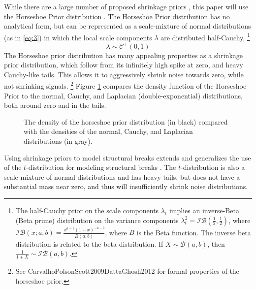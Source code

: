 \documentclass{article}
\newcommand{\dist}[1]{\mathcal{#1}}
\newcommand{\paren}[1]{\ensuremath{\left(#1\right)}}
\newcommand{\dhalfcauchy}[1]{\ensuremath{\dist{C}^{+}\paren{#1}}}
\newcommand{\dbeta}[1]{\ensuremath{\dist{B}\paren{#1}}}
\newcommand{\dinvbeta}[1]{\ensuremath{\dist{IB}\paren{#1}}}
\begin{document}
While there are a large number of proposed shrinkage priors \textcite{ArmaganDunsonLee2011}\textcite{BrownGriffin2010}\textcite{PolsonScott2010}, this paper will use the Horseshoe Prior distribution \parencites{CarvalhoPolsonScott2009}{CarvalhoPolsonScott2010}{PolsonScott2010}{PolsonScott2012}{DattaGhosh2012}.
The Horseshoe Prior distribution has no analytical form, but can be represented as a scale-mixture of normal distributions (as in \eqref{eq:3}) in which the local scale components $\lambda$ are distributed half-Cauchy,%
\footnote{
The half-Cauchy prior on the scale components $\lambda_{t}$ implies an inverse-Beta (Beta prime) distribution on the variance components $\lambda_{t}^{2} = \dinvbeta{\frac{1}{2}, \frac{1}{2}}$, where $\dinvbeta{x; a, b} = \frac{x^{a - 1} (1 + x)^{-a - b}}{B(a, b)}$, where $B$ is the Beta function.
The inverse beta distribution is related to the beta distribution.
If $X \sim \dbeta{a, b}$, then $\frac{1}{1 + X} \sim \dinvbeta{a, b}$.
}
\begin{equation}
  \label{eq:6}
  \lambda \sim \dhalfcauchy{0, 1}
\end{equation}
The Horseshoe prior distribution has many appealing properties as a shrinkage prior distribution, which follow from its infinitely high spike at zero, and heavy Cauchy-like tails.
This allows it to aggressively shrink noise towards zero, while not shrinking signals.%
\footnote{See \textcite{CarvalhoPolsonScott2010}{CarvalhoPolsonScott2009}{DattaGhosh2012} for formal properties of the horseshoe prior.}
Figure \ref{fig:horseshoe} compares the density function of the Horseshoe Prior to the normal, Cauchy, and Laplacian (double-exponential) distributions, both around zero and in the tails.
\begin{figure}
  \centering
  \caption{The density of the horseshoe prior distribution (in black) compared with the densities of the normal, Cauchy, and Laplacian distributions (in gray).}
  \label{fig:horseshoe}
\end{figure}

Using shrinkage priors to model structural breaks extends and generalizes the use of the $t$-distribution for modeling structural breaks \textcites{HarveyKoopman2000}[184][]{DurbinKoopman2001}{PetrisPetroneEtAl2009}.
The $t$-distribution is also a scale-mixture of normal distributions and has heavy tails, but does not have a substantial mass near zero, and thus will insufficiently shrink noise distributions.
\end{document}
